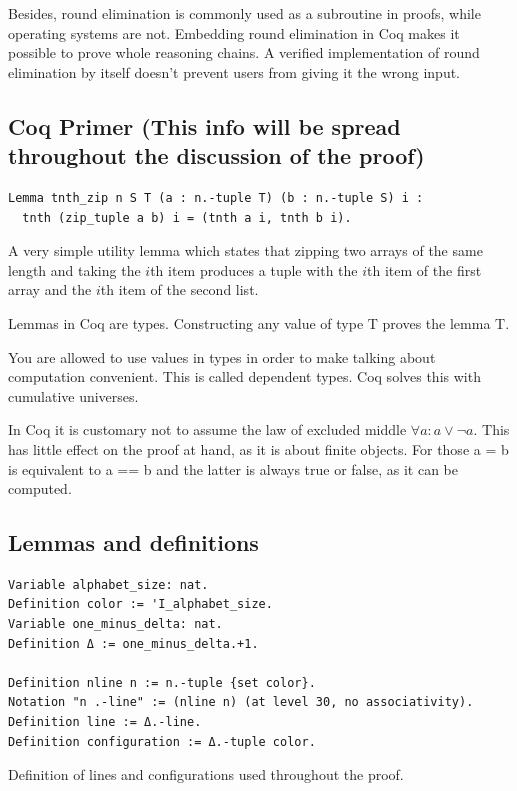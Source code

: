\documentclass[english, 12pt, a4paper, sci, a-1b, online]{aaltothesis}
\begin{document}
Besides, round elimination is commonly used as a subroutine in proofs, while operating systems are not. Embedding round elimination in Coq makes it possible to prove whole reasoning chains. A verified implementation of round elimination by itself doesn't prevent users from giving it the wrong input.

\subsection{Coq Primer (This info will be spread throughout the discussion of the proof)}

\begin{listing}[h]
\begin{verbatim}
Lemma tnth_zip n S T (a : n.-tuple T) (b : n.-tuple S) i :
  tnth (zip_tuple a b) i = (tnth a i, tnth b i).
\end{verbatim}
\caption{A very simple utility lemma which states that zipping two arrays of the same length and taking the $i$th item produces a tuple with the $i$th item of the first array and the $i$th item of the second list.}
\end{listing}

Lemmas in Coq are types. Constructing any value of type T proves the lemma T.

You are allowed to use values in types in order to make talking about computation convenient. This is called dependent types. Coq solves this with cumulative universes.

In Coq it is customary not to assume the law of excluded middle $\forall a : a \lor \lnot a$. This has little effect on the proof at hand, as it is about finite objects. For those a = b is equivalent to a == b and the latter is always true or false, as it can be computed.

\subsection{Lemmas and definitions}

\begin{listing}[h]
\begin{verbatim}
Variable alphabet_size: nat.
Definition color := 'I_alphabet_size.
Variable one_minus_delta: nat.
Definition Δ := one_minus_delta.+1.

Definition nline n := n.-tuple {set color}.
Notation "n .-line" := (nline n) (at level 30, no associativity).
Definition line := Δ.-line.
Definition configuration := Δ.-tuple color.
\end{verbatim}
\caption{Definition of lines and configurations used throughout the proof.}
\end{listing}
\end{document}
